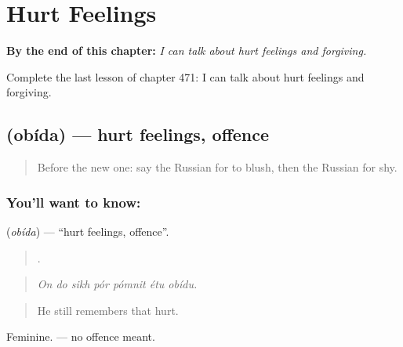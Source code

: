 
\chapter{Hurt Feelings}
\label{ch:ru-hurt-feelings}

\begin{chapteropening}
\textbf{By the end of this chapter:} \emph{I can talk about hurt feelings and forgiving.}

Complete the last lesson of chapter 471: I can talk about hurt feelings and forgiving.
\end{chapteropening}

\section[\texorpdfstring{\ru{обида} (obída)}{обида (obída)}]{ (obída) — hurt feelings, offence}

\label{lesson:RU-C471-obida}



\begin{quote}
Before the new one: say the Russian for to blush, then the Russian for shy.
\end{quote}

\subsection*{You'll want to know: }
\textbf{} (\emph{obída}) — \textquotedblleft{}hurt feelings, offence\textquotedblright{}.

\begin{quote}
      .
\end{quote}

\begin{quote}
\emph{On do sikh pór pómnit étu obídu.}
\end{quote}

\begin{quote}
He still remembers that hurt.
\end{quote}

Feminine. \emph{  } — no offence meant.

